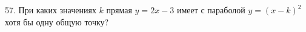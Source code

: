 57. При каких значениях $k$ прямая $y=2x-3$ имеет с параболой $y=(x-k)^2$ хотя бы одну общую точку?\\
